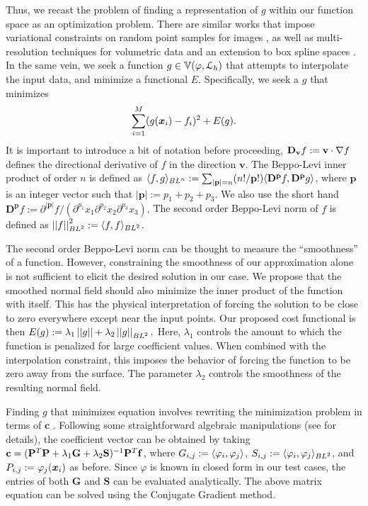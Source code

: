 Thus, we recast the problem of finding a representation of $g$ within our function space as an optimization problem. 
There are similar works that impose variational constraints on random point samples for images \cite{variational}, as well as multi-resolution techniques for volumetric data \cite{onvari} and an extension to box spline spaces \cite{xu2012rec}. 
In the same vein, we seek a function $g \in \aspace{\lattice{L}_h}{\varphi}$ that attempts to interpolate the input data, and minimize a functional $E$. 
Specifically, we seek a $g$ that minimizes {\small 
\begin{equation} \label{eq:minexp}
 	\sump_{i=1}^{M} (g(\vx_i) -  f_i)^2 + E(g).
\end{equation}}
It is important to introduce a bit of notation before proceeding, $\dv{\mathbf{v}} f := \mathbf{v} \cdot \grad f$ defines the directional derivative of $f$ in the direction $\mathbf{v}$. 
The Beppo-Levi inner product of order $n$ is defined as $\blip{n}{f}{g}:= \sum_{|\mathbf{p}|=n}({n!}/{\mathbf{p}!}) \innerp{\mathbf{D^p}f}{\mathbf{D^p}g}$, where $\mathbf{p}$ is an integer vector such that $\left| \mathbf{p}\right| := p_1 + p_2 + p_3 $. 
We also use the short hand $\mathbf{D^p}f := \partial^{\left| \mathbf{p}\right|}f/({\partial^{p_1}x_1}{\partial^{p_2}x_2}{\partial^{p_3}x_3}).$ 
The second order Beppo-Levi norm of $f$ is defined as $\bln{2}{f}^2:=\blip{2}{f}{f}$.

The second order Beppo-Levi norm can be thought to measure the ``smoothness'' of a function. However, constraining the smoothness of our approximation alone is not sufficient to elicit the desired solution in our case. 
We propose that the smoothed normal field should also minimize the inner product of the function with itself. 
This has the physical interpretation of forcing the solution to be close to zero everywhere except near the input points. 
Our proposed cost functional is then $E(g) := \lambda_1 \left|\left|{g}\right|\right| + \lambda_2 \bln{2}{g}.$ 
Here, $\lambda_1$ controls the amount to which the function is penalized for large coefficient values. 
When combined with the interpolation constraint, this imposes the behavior of forcing the function to be zero away from the surface. 
The parameter $\lambda_2$ controls the smoothness of the resulting normal field.

Finding $g$ that minimizes equation  involves rewriting the minimization problem in terms of $\mathbf{c}$ \cite{xu2012rec}. 
Following some straightforward algebraic manipulations (see \cite{xu2012rec} for details), the coefficient vector can be obtained by taking $\mathbf{c} = ( \mathbf{\Phii}^T\mathbf{\Phii} + \lambda_1\mathbf{G} + \lambda_2\mathbf{S})^{-1}\mathbf{\Phii}^T\mathbf{f}$, where $G_{i,j}:=\innerp{\varphi_i}{\varphi_j}$, $S_{i,j}:=\blip{2}{\varphi_i}{\varphi_j}$, and $P_{i,j} := \varphi_j(\vx_i)$ as before. 
Since $\varphi$ is known in closed form in our test cases, the entries of both $\mathbf{G}$ and $\mathbf{S}$ can be evaluated analytically. 
The above matrix equation can be solved using the Conjugate Gradient method.
